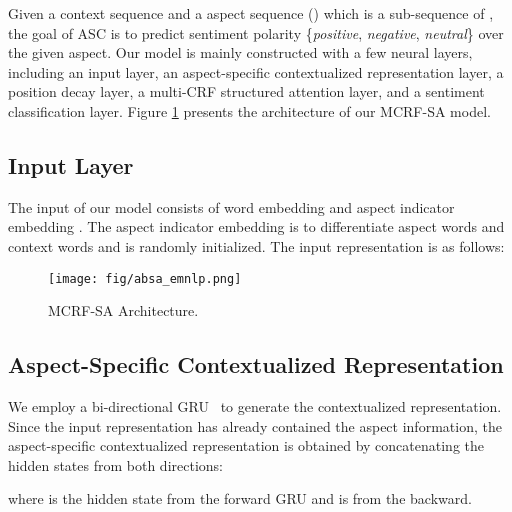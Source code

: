 \documentclass[11pt,a4paper]{article}
\begin{document}
Given a context sequence  and a aspect sequence  () which is a sub-sequence of , the goal of ASC is to predict sentiment polarity  \{{\em positive}, {\em negative}, {\em neutral}\} over the given aspect.
Our model is mainly constructed with a few neural layers, including an input layer, an aspect-specific contextualized representation layer, a position decay layer, a multi-CRF structured  attention layer, and a sentiment classification layer. Figure \ref{fig:architecture} presents the architecture of our MCRF-SA model.









\subsection{Input Layer}
The input of our model consists of word embedding  and aspect indicator embedding . The aspect indicator embedding is to differentiate aspect words and context words and is randomly initialized.  The input representation  is as follows:
\setlength{\abovedisplayskip}{-5pt} \setlength{\abovedisplayshortskip}{-5pt}









\begin{figure}[!t]
    \centering
    \texttt{[image: fig/absa\_emnlp.png]}
\caption{MCRF-SA Architecture.}
    \label{fig:architecture}
\vspace{-1mm}

\end{figure}

\subsection{{Aspect-Specific Contextualized Representation}}
We employ a bi-directional GRU~\cite{Cho2014OnTP} to generate the contextualized  representation.
Since the input representation has already contained the aspect information,  the aspect-specific contextualized representation is obtained by concatenating the hidden states from both directions:
\setlength{\abovedisplayskip}{7pt} \setlength{\abovedisplayshortskip}{7pt}
\setlength{\belowdisplayskip}{7pt} \setlength{\belowdisplayshortskip}{7pt}

where  is the hidden state from the forward GRU and  is from the backward.
\end{document}
